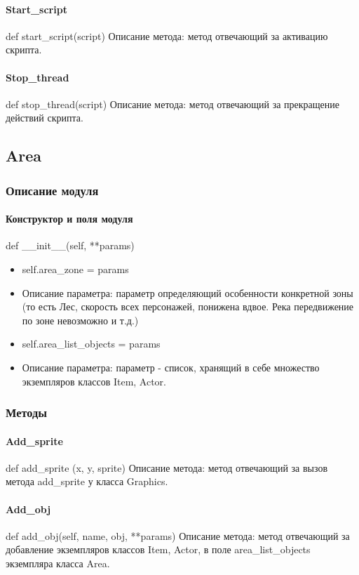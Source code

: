 \paragraph{Start\_script}
def start\_script(script)
Описание метода: метод отвечающий за активацию скрипта.
\paragraph{Stop\_thread}
def stop\_thread(script)
Описание метода: метод отвечающий за прекращение действий скрипта.

\subsection{Area}
\subsubsection{Описание модуля}
\paragraph{Конструктор и поля модуля}
def \_\_init\_\_(self, **params)
\begin{itemize}
	\item self.area\_zone = params
	\item Описание параметра: параметр определяющий особенности конкретной зоны (то есть Лес, скорость всех персонажей, понижена вдвое. Река передвижение по зоне невозможно и т.д.) %
	\item self.area\_list\_objects = params 
	\item Описание параметра: параметр - список, хранящий в себе множество экземпляров классов Item, Actor.
\end{itemize}
\subsubsection{Методы}
\paragraph{Add\_sprite}
def add\_sprite (x, y, sprite)
Описание метода: метод отвечающий за вызов метода add\_sprite у класса Graphics.
\paragraph{Add\_obj}
def add\_obj(self, name, obj, **params)
Описание метода: метод отвечающий за добавление экземпляров классов Item, Actor, в поле area\_list\_objects экземпляра класса Area.
